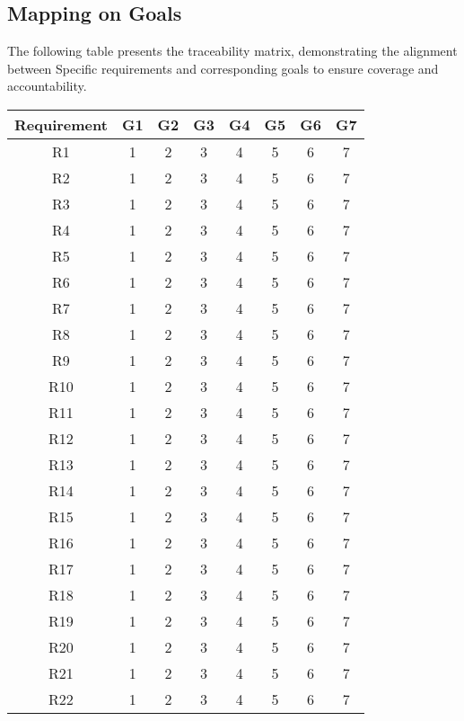 \subsection{Mapping on Goals}
The following table presents the traceability matrix, demonstrating the alignment between Specific requirements and corresponding goals to ensure coverage and accountability.

\renewcommand{\arraystretch}{1.5}
\begin{longtable}{|c|c|c|c|c|c|c|c|}
    \hline \rowcolor{polimiblue!40}
    \textbf{Requirement} & \textbf{G1} & \textbf{G2} & \textbf{G3} & \textbf{G4} & \textbf{G5} & \textbf{G6} & \textbf{G7} \\ \hline
    R1 & 1 & 2 & 3 & 4 & 5 & 6 & 7 \\ \hline
    R2 & 1 & 2 & 3 & 4 & 5 & 6 & 7 \\ \hline
    R3 & 1 & 2 & 3 & 4 & 5 & 6 & 7 \\ \hline
    R4 & 1 & 2 & 3 & 4 & 5 & 6 & 7 \\ \hline
    R5 & 1 & 2 & 3 & 4 & 5 & 6 & 7 \\ \hline
    R6 & 1 & 2 & 3 & 4 & 5 & 6 & 7 \\ \hline
    R7 & 1 & 2 & 3 & 4 & 5 & 6 & 7 \\ \hline
    R8 & 1 & 2 & 3 & 4 & 5 & 6 & 7 \\ \hline
    R9 & 1 & 2 & 3 & 4 & 5 & 6 & 7 \\ \hline
    R10 & 1 & 2 & 3 & 4 & 5 & 6 & 7 \\ \hline
    R11 & 1 & 2 & 3 & 4 & 5 & 6 & 7 \\ \hline
    R12 & 1 & 2 & 3 & 4 & 5 & 6 & 7 \\ \hline
    R13 & 1 & 2 & 3 & 4 & 5 & 6 & 7 \\ \hline
    R14 & 1 & 2 & 3 & 4 & 5 & 6 & 7 \\ \hline
    R15 & 1 & 2 & 3 & 4 & 5 & 6 & 7 \\ \hline
    R16 & 1 & 2 & 3 & 4 & 5 & 6 & 7 \\ \hline
    R17 & 1 & 2 & 3 & 4 & 5 & 6 & 7 \\ \hline
    R18 & 1 & 2 & 3 & 4 & 5 & 6 & 7 \\ \hline
    R19 & 1 & 2 & 3 & 4 & 5 & 6 & 7 \\ \hline
    R20 & 1 & 2 & 3 & 4 & 5 & 6 & 7 \\ \hline
    R21 & 1 & 2 & 3 & 4 & 5 & 6 & 7 \\ \hline
    R22 & 1 & 2 & 3 & 4 & 5 & 6 & 7 \\ \hline

\end{longtable}
